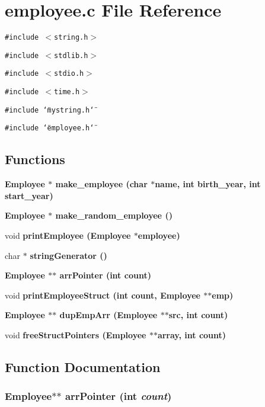 \section{employee.c File Reference}
\label{employee_8c}
{\tt \#include $<$string.h$>$}\par
{\tt \#include $<$stdlib.h$>$}\par
{\tt \#include $<$stdio.h$>$}\par
{\tt \#include $<$time.h$>$}\par
{\tt \#include \char`\"{}mystring.h\char`\"{}}\par
{\tt \#include \char`\"{}employee.h\char`\"{}}\par
\subsection*{Functions}
\begin{CompactItemize}
\item 
\bf{Employee} $\ast$ \bf{make\_\-employee} (char $\ast$name, int birth\_\-year, int start\_\-year)
\item 
\bf{Employee} $\ast$ \bf{make\_\-random\_\-employee} ()
\item 
void \bf{print\-Employee} (\bf{Employee} $\ast$employee)
\item 
char $\ast$ \bf{string\-Generator} ()
\item 
\bf{Employee} $\ast$$\ast$ \bf{arr\-Pointer} (int count)
\item 
void \bf{print\-Employee\-Struct} (int count, \bf{Employee} $\ast$$\ast$emp)
\item 
\bf{Employee} $\ast$$\ast$ \bf{dup\-Emp\-Arr} (\bf{Employee} $\ast$$\ast$src, int count)
\item 
void \bf{free\-Struct\-Pointers} (\bf{Employee} $\ast$$\ast$array, int count)
\end{CompactItemize}


\subsection{Function Documentation}
\subsubsection{\setlength{\rightskip}{0pt plus 5cm}\bf{Employee}$\ast$$\ast$ arr\-Pointer (int {\em count})}\label{employee_8c_a9a68360f1e967527dc28cf9a58e3524}


